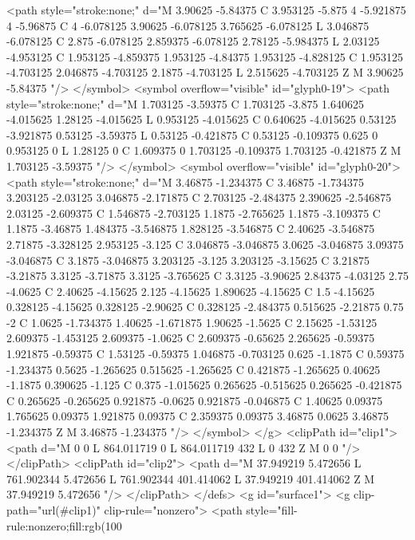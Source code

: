 <path style="stroke:none;" d="M 3.90625 -5.84375 C 3.953125 -5.875 4 -5.921875 4 -5.96875 C 4 -6.078125 3.90625 -6.078125 3.765625 -6.078125 L 3.046875 -6.078125 C 2.875 -6.078125 2.859375 -6.078125 2.78125 -5.984375 L 2.03125 -4.953125 C 1.953125 -4.859375 1.953125 -4.84375 1.953125 -4.828125 C 1.953125 -4.703125 2.046875 -4.703125 2.1875 -4.703125 L 2.515625 -4.703125 Z M 3.90625 -5.84375 "/>
</symbol>
<symbol overflow="visible" id="glyph0-19">
<path style="stroke:none;" d="M 1.703125 -3.59375 C 1.703125 -3.875 1.640625 -4.015625 1.28125 -4.015625 L 0.953125 -4.015625 C 0.640625 -4.015625 0.53125 -3.921875 0.53125 -3.59375 L 0.53125 -0.421875 C 0.53125 -0.109375 0.625 0 0.953125 0 L 1.28125 0 C 1.609375 0 1.703125 -0.109375 1.703125 -0.421875 Z M 1.703125 -3.59375 "/>
</symbol>
<symbol overflow="visible" id="glyph0-20">
<path style="stroke:none;" d="M 3.46875 -1.234375 C 3.46875 -1.734375 3.203125 -2.03125 3.046875 -2.171875 C 2.703125 -2.484375 2.390625 -2.546875 2.03125 -2.609375 C 1.546875 -2.703125 1.1875 -2.765625 1.1875 -3.109375 C 1.1875 -3.46875 1.484375 -3.546875 1.828125 -3.546875 C 2.40625 -3.546875 2.71875 -3.328125 2.953125 -3.125 C 3.046875 -3.046875 3.0625 -3.046875 3.09375 -3.046875 C 3.1875 -3.046875 3.203125 -3.125 3.203125 -3.15625 C 3.21875 -3.21875 3.3125 -3.71875 3.3125 -3.765625 C 3.3125 -3.90625 2.84375 -4.03125 2.75 -4.0625 C 2.40625 -4.15625 2.125 -4.15625 1.890625 -4.15625 C 1.5 -4.15625 0.328125 -4.15625 0.328125 -2.90625 C 0.328125 -2.484375 0.515625 -2.21875 0.75 -2 C 1.0625 -1.734375 1.40625 -1.671875 1.90625 -1.5625 C 2.15625 -1.53125 2.609375 -1.453125 2.609375 -1.0625 C 2.609375 -0.65625 2.265625 -0.59375 1.921875 -0.59375 C 1.53125 -0.59375 1.046875 -0.703125 0.625 -1.1875 C 0.59375 -1.234375 0.5625 -1.265625 0.515625 -1.265625 C 0.421875 -1.265625 0.40625 -1.1875 0.390625 -1.125 C 0.375 -1.015625 0.265625 -0.515625 0.265625 -0.421875 C 0.265625 -0.265625 0.921875 -0.0625 0.921875 -0.046875 C 1.40625 0.09375 1.765625 0.09375 1.921875 0.09375 C 2.359375 0.09375 3.46875 0.0625 3.46875 -1.234375 Z M 3.46875 -1.234375 "/>
</symbol>
</g>
<clipPath id="clip1">
  <path d="M 0 0 L 864.011719 0 L 864.011719 432 L 0 432 Z M 0 0 "/>
</clipPath>
<clipPath id="clip2">
  <path d="M 37.949219 5.472656 L 761.902344 5.472656 L 761.902344 401.414062 L 37.949219 401.414062 Z M 37.949219 5.472656 "/>
</clipPath>
</defs>
<g id="surface1">
<g clip-path="url(#clip1)" clip-rule="nonzero">
<path style="fill-rule:nonzero;fill:rgb(100%
